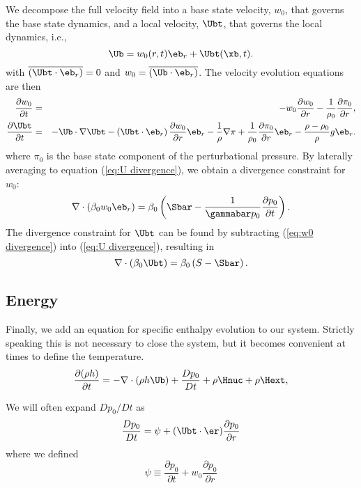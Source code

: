 We decompose the full velocity field into a base state velocity,
$w_0$, that governs the base state dynamics, and a local velocity,
$\Ubt$, that governs the local dynamics, i.e., 
\begin{equation}
\Ub = w_0(r,t)\eb_r + \Ubt(\xb,t).
\end{equation}
with
$\overline{(\Ubt\cdot\eb_r)} = 0$ and
$w_0 = \overline{(\Ub\cdot\eb_r)}$.
The velocity evolution equations are then 
\begin{eqnarray}
\frac{\partial w_0}{\partial t} &=& -w_0\frac{\partial w_0}{\partial
  r} - \frac{1}{\rho_0}\frac{\partial\pi_0}{\partial r},\label{eq:w0
  evolution}\\ \frac{\partial\Ubt}{\partial t} &=& -\Ub\cdot\nabla\Ubt
  - \left(\Ubt\cdot\eb_r\right)\frac{\partial w_0}{\partial r}\eb_r -
\frac{1}{\rho}\nabla\pi +
\frac{1}{\rho_0}\frac{\partial\pi_0}{\partial r}\eb_r -
\frac{\rho-\rho_0}{\rho}g\eb_r.\label{eq:utildeupd}
\end{eqnarray}
where $\pi_0$ is the base state component of the perturbational pressure.
By laterally averaging to equation (\ref{eq:U divergence}),
we obtain a divergence constraint for $w_0$:
\begin{equation}
\nabla\cdot(\beta_0 w_0 \eb_r) = 
    \beta_0\left(\Sbar - \frac{1}{\gammabar p_0}
           \frac{\partial p_0}{\partial t}\right).\label{eq:w0 divergence}
\end{equation}
The divergence constraint for $\Ubt$ can be found by subtracting
(\ref{eq:w0 divergence}) into (\ref{eq:U divergence}), resulting in
\begin{equation}
\nabla\cdot\left(\beta_0\Ubt\right) = \beta_0\left(S-\Sbar\right).\label{eq:utilde divergence}
\end{equation}

\subsection{Energy}

Finally, we add an equation for specific enthalpy evolution to our
system.  Strictly speaking this is not necessary to close the system,
but it becomes convenient at times to define the temperature.
\begin{equation}
\frac{\partial(\rho h)}{\partial t} = 
   -\nabla\cdot(\rho h\Ub) + \frac{Dp_0}{Dt} + \rho\Hnuc + \rho\Hext,\label{eq:flow:enthalpy}
\end{equation}

We will often expand $Dp_0/Dt$ as
\begin{equation}
\frac{Dp_0}{Dt} = \psi + (\Ubt \cdot \er) \frac{\partial p_0}{\partial r}
\end{equation}
where we defined
\begin{equation}
\psi \equiv \frac{\partial p_0}{\partial t} + w_0 \frac{\partial p_0}{\partial r}
\end{equation}

